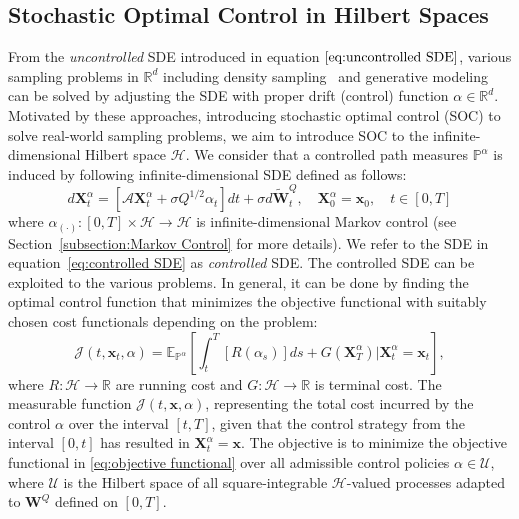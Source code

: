 \documentclass[nohyperref]{article}
\theoremstyle{plain}
\theoremstyle{remark}
\newcommand{\mc}{\mathcal}
\newcommand{\mb}{\mathbf}
\begin{document}
\subsection{Stochastic Optimal Control in Hilbert Spaces}
From the \textit{uncontrolled} SDE introduced in equation $\eqref{eq:uncontrolled SDE}$, various sampling problems in $\mathbb{R}^d$ including density sampling~\citep{zhang2022path, berner2022optimal, vargas2023bayesian} and generative modeling~\citep{chen2022likelihood, chen2024generative} can be solved by adjusting the SDE with proper drift (control) function $\alpha \in \mathbb{R}^d$. 
Motivated by these approaches, introducing stochastic optimal control (SOC) to solve real-world sampling problems, we aim to introduce SOC to the infinite-dimensional Hilbert space $\mc{H}$.
We consider that a controlled path measures $\mathbb{P}^{\alpha}$ is induced by following infinite-dimensional SDE defined as follows:
\begin{equation}\label{eq:controlled SDE}
    d\mb{X}^{\alpha}_t = \left[ \mc{A}\mb{X}^{\alpha}_t  + \sigma Q^{1/2}\alpha_t \right] dt + \sigma d\mb{\tilde{W}}^Q_t, \quad \mb{X}^{\alpha}_0 = \mb{x}_0, \quad t \in [0, T]
\end{equation}
where $\alpha_{(\cdot)} : [0, T] \times \mc{H} \to \mc{H}$  is infinite-dimensional Markov control (see Section~\ref{subsection:Markov Control} for more details). 
We refer to the SDE in equation~\eqref{eq:controlled SDE} as \textit{controlled} SDE. 
The controlled SDE can be exploited to the various problems. 
In general, it can be done by finding the optimal control function that minimizes the objective functional with suitably chosen cost functionals depending on the problem:
\begin{equation}\label{eq:objective functional}
\mc{J}(t, \mb{x}_{t}, \alpha) = 
\mathbb{E}_{\mathbb{P}^{\alpha}}\left[\int_t^T \left[R(\alpha_s)\right] ds +  G(\mb{X}_T^{\alpha}) \big| \mb{X}^{\alpha}_t = \mb{x}_t  \right],
\end{equation}
where $R : \mc{H} \to \mathbb{R}$ are running cost and $G: \mc{H} \to \mathbb{R}$ is terminal cost. 
The measurable function $\mc{J}(t, \mb{x}, \alpha)$, representing the total cost incurred by the control $\alpha$ over the interval $[t, T]$, given that the control strategy from the interval $[0, t]$ has resulted in $\mb{X}^{\alpha}_t = \mb{x}$. The objective is to minimize the objective functional in \eqref{eq:objective functional} over all admissible control policies $\alpha \in \mc{U}$, where $\mc{U}$ is the Hilbert space of all square-integrable $\mc{H}$-valued processes adapted to $\mb{W}^Q$ defined on $[0, T]$. 
\end{document}
